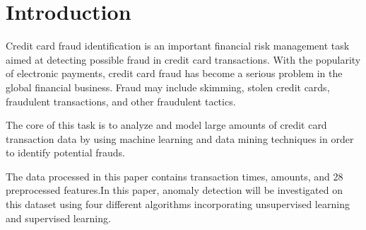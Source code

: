 
\section{Introduction}\label{sec-intro}














Credit card fraud identification is an important financial risk management task aimed at detecting possible fraud in credit card transactions. With the popularity of electronic payments, credit card fraud has become a serious problem in the global financial business. Fraud may include skimming, stolen credit cards, fraudulent transactions, and other fraudulent tactics.

The core of this task is to analyze and model large amounts of credit card transaction data by using machine learning and data mining techniques in order to identify potential frauds.



The data processed in this paper contains transaction times, amounts, and 28 preprocessed features.In this paper, anomaly detection will be investigated on this dataset using four different algorithms incorporating unsupervised learning and supervised learning.

